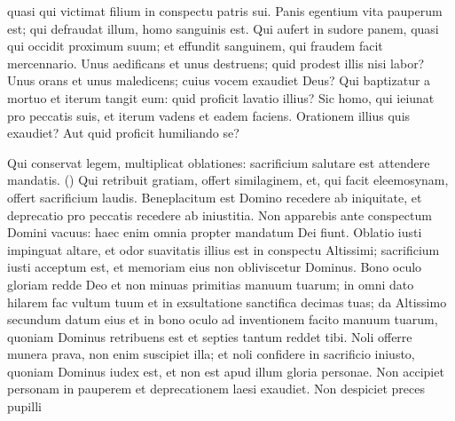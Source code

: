 \begin{biblechapter}
\begin{biblechapter}
\begin{biblechapter}
\begin{biblechapter}
\begin{biblechapter}
\begin{biblechapter}
\begin{biblechapter}
\begin{biblechapter}
\begin{biblechapter}
\begin{biblechapter}
\begin{biblechapter}
\begin{biblechapter}
\begin{biblechapter}
\begin{biblechapter}
\begin{biblechapter}
\begin{biblechapter}
\begin{biblechapter}
\begin{biblechapter}
\begin{biblechapter}
\begin{biblechapter}
\begin{biblechapter}
\begin{biblechapter}
\begin{biblechapter}
\begin{biblechapter}
\begin{biblechapter}
\begin{biblechapter}
\begin{biblechapter}
\begin{biblechapter}
\begin{biblechapter}
\begin{biblechapter}
\begin{biblechapter}
\begin{biblechapter}
\begin{biblechapter}
\begin{biblechapter}
 quasi qui victimat filium in conspectu patris sui.
 \verse Panis egentium vita pauperum est;
 qui defraudat illum, homo sanguinis est.
 \verse Qui aufert in sudore panem,
 quasi qui occidit proximum suum;
 \verse et effundit sanguinem,
 qui fraudem facit mercennario.
 \verse Unus aedificans et unus destruens;
 quid prodest illis nisi labor?
 \verse Unus orans et unus maledicens;
 cuius vocem exaudiet Deus?
 \verse Qui baptizatur a mortuo et iterum tangit eum:
 quid proficit lavatio illius?
 \verse Sic homo, qui ieiunat pro peccatis suis,
 et iterum vadens et eadem faciens.
 Orationem illius quis exaudiet?
 Aut quid proficit humiliando se?
 
\begin{biblechapter}
\verse Qui conservat legem, multiplicat oblationes:
 \verse sacrificium salutare est attendere mandatis. (\verse)
 \verse Qui retribuit gratiam, offert similaginem,
 et, qui facit eleemosynam, offert sacrificium laudis.
 \verse Beneplacitum est Domino recedere ab iniquitate,
 et deprecatio pro peccatis recedere ab iniustitia.
 \verse Non apparebis ante conspectum Domini vacuus:
 \verse haec enim omnia propter mandatum Dei fiunt.
 \verse Oblatio iusti impinguat altare,
 et odor suavitatis illius est in conspectu Altissimi;
 \verse sacrificium iusti acceptum est,
 et memoriam eius non obliviscetur Dominus.
 \verse Bono oculo gloriam redde Deo
 et non minuas primitias manuum tuarum;
 \verse in omni dato hilarem fac vultum tuum
 et in exsultatione sanctifica decimas tuas;
 \verse da Altissimo secundum datum eius
 et in bono oculo ad inventionem facito manuum tuarum,
 \verse quoniam Dominus retribuens est
 et septies tantum reddet tibi.
 \verse Noli offerre munera prava,
 non enim suscipiet illa;
 \verse et noli confidere in sacrificio iniusto,
 quoniam Dominus iudex est,
 et non est apud illum gloria personae.
 \verse Non accipiet personam in pauperem
 et deprecationem laesi exaudiet.
 \verse Non despiciet preces pupilli

\end{biblechapter}
\end{biblechapter}
\end{biblechapter}
\end{biblechapter}
\end{biblechapter}
\end{biblechapter}
\end{biblechapter}
\end{biblechapter}
\end{biblechapter}
\end{biblechapter}
\end{biblechapter}
\end{biblechapter}
\end{biblechapter}
\end{biblechapter}
\end{biblechapter}
\end{biblechapter}
\end{biblechapter}
\end{biblechapter}
\end{biblechapter}
\end{biblechapter}
\end{biblechapter}
\end{biblechapter}
\end{biblechapter}
\end{biblechapter}
\end{biblechapter}
\end{biblechapter}
\end{biblechapter}
\end{biblechapter}
\end{biblechapter}
\end{biblechapter}
\end{biblechapter}
\end{biblechapter}
\end{biblechapter}
\end{biblechapter}
\end{biblechapter}
